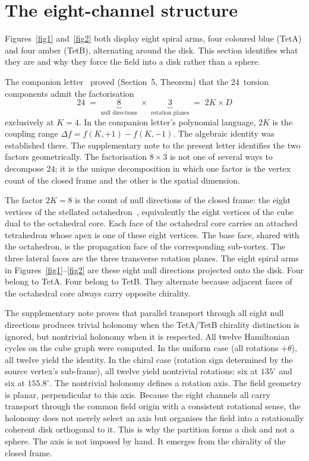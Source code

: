 \documentclass[twocolumn]{iopjournal}
\begin{document}
\section{The eight-channel structure}

Figures~\ref{fig1} and~\ref{fig2} both display eight spiral
arms, four coloured blue (TetA) and four amber (TetB),
alternating around the disk.  This section identifies what they
are and why they force the field into a disk rather than a
sphere.

The companion letter~\cite{Nelson2026b} proved (Section~5,
Theorem) that the 24~torsion components admit the
factorisation
\begin{equation}
  24 \;=\; \underbrace{8}_{\text{null directions}}
        \;\times\; \underbrace{3}_{\text{rotation planes}}
  \;=\; 2K \times D
  \label{eq:24}
\end{equation}
exclusively at $K = 4$.  In the companion letter's polynomial
language, $2K$ is the coupling range
$\Delta f = f(K,{+}1) - f(K,{-}1)$.  The algebraic identity
was established there.  The supplementary note to the present
letter identifies the two factors geometrically.  The
factorisation $8 \times 3$ is not one of several ways to
decompose 24; it is the unique decomposition in which one
factor is the vertex count of the closed frame and the other
is the spatial dimension.

The factor $2K = 8$ is the count of null directions of the
closed frame: the eight vertices of the stellated
octahedron~\cite{Nelson2026a}, equivalently the eight vertices
of the cube dual to the octahedral core.  Each face of the
octahedral core carries an attached tetrahedron whose apex is
one of these eight vertices.  The base face, shared with the
octahedron, is the propagation face of the corresponding
sub-vortex.  The three lateral faces are the three transverse
rotation planes.  The eight spiral arms in
Figures~\ref{fig1}--\ref{fig2} are these eight null directions
projected onto the disk.  Four belong to TetA.  Four belong to
TetB.  They alternate because adjacent faces of the octahedral
core always carry opposite chirality.

The supplementary note proves that parallel transport through
all eight null directions produces trivial holonomy when the
TetA/TetB chirality distinction is ignored, but nontrivial
holonomy when it is respected.  All twelve Hamiltonian cycles
on the cube graph were computed.  In the uniform case (all
rotations $+\theta$), all twelve yield the identity.  In the
chiral case (rotation sign determined by the source vertex's
sub-frame), all twelve yield nontrivial rotations: six at
$135^{\circ}$ and six at $155.8^{\circ}$.  The nontrivial
holonomy defines a rotation axis.  The field geometry is
planar, perpendicular to this axis.  Because the eight
channels all carry transport through the common field origin
with a consistent rotational sense, the holonomy does not
merely select an axis but organises the field into a
rotationally coherent disk orthogonal to it.  This is why the
partition forms a disk and not a sphere.  The axis is not imposed by
hand.  It emerges from the chirality of the closed frame.
\end{document}
